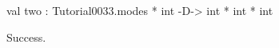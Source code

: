 \runverbatimtrue
{}
\begin{RunVerbatimMsg}
val two : Tutorial0033.modes * int -D-> int * int * int
\end{RunVerbatimMsg}
\begin{RunVerbatimErr}
Success.
\end{RunVerbatimErr}

